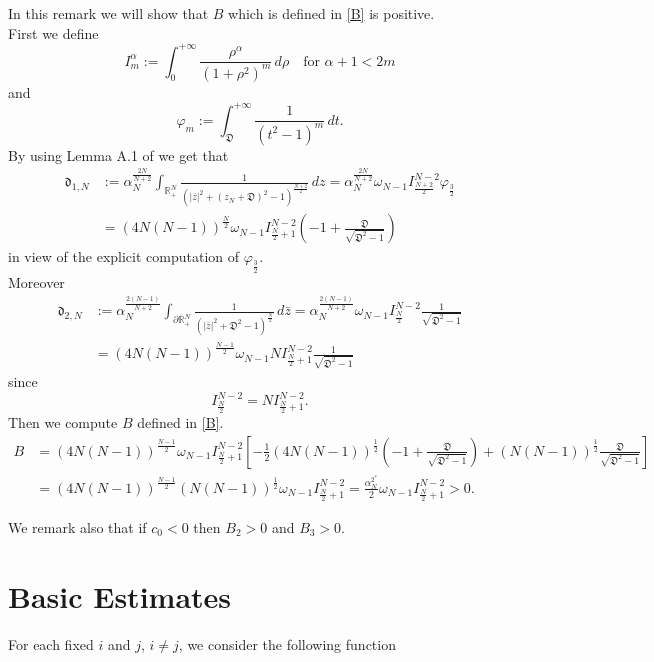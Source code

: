 \documentclass[11pt,a4paper]{amsart}
\begin{document}
\begin{remark}\label{oss}
In this remark we will show that $B$ which is defined in \eqref{B} is positive.\\
First we define $$I_m^\alpha:=\int_0^{+\infty}\frac{\rho^\alpha}{(1+\rho^2)^m}\, d\rho\quad\mbox{for}\,\, \alpha+1<2m$$ and $$\varphi_m:=\int_{\mathfrak D}^{+\infty}\frac{1}{(t^2-1)^m}\, dt.$$
By using Lemma A.1 of \cite{Cruz-BlazquezPistoiaVaira_2022} we get that
$$\begin{aligned}\mathfrak d_{1, N}&:=\alpha_N^{\frac{2N}{N+2}}\int_{\mathbb R^N_+}\frac{1}{\left(|\bar z|^2+(z_N+\mathfrak D)^2-1\right)^{\frac{N+2}{2}}}\, dz=\alpha_N^{\frac{2N}{N+2}}\omega_{N-1}I_{\frac{N+2}{2}}^{N-2}\varphi_{\frac 32}\\
&=\left(4N(N-1)\right)^{\frac N 2}\omega_{N-1}I_{\frac N 2+1}^{N-2}\left(-1+\frac{\mathfrak D}{\sqrt{\mathfrak D^2-1}}\right)\end{aligned}$$
in view of the explicit computation of $\varphi_{\frac 32}$.\\ Moreover
$$\begin{aligned}\mathfrak d_{2, N}&:=\alpha_N^{\frac{2(N-1)}{N+2}}\int_{\partial\mathbb R^N_+}\frac{1}{\left(|\bar z|^2+\mathfrak D^2-1\right)^{\frac{N}{2}}}\, d\bar z=\alpha_N^{\frac{2(N-1)}{N+2}}\omega_{N-1}I_{\frac{N}{2}}^{N-2}\frac{1}{\sqrt{\mathfrak D^2-1}}\\
&=\left(4N(N-1)\right)^{\frac{ N-1}{ 2}}\omega_{N-1}N I_{\frac N 2+1}^{N-2}\frac{1}{\sqrt{\mathfrak D^2-1}}\end{aligned}$$
since $$I_{\frac N2}^{N-2}=N I_{\frac N 2+1}^{N-2}.$$ Then we compute $B$ defined in \eqref{B}.
$$\begin{aligned} B&=\left(4N(N-1)\right)^{\frac{ N-1}{ 2}}\omega_{N-1} I_{\frac N 2+1}^{N-2}\left[-\frac12\left(4N(N-1)\right)^{\frac{ 1}{ 2}}\left( -1+\frac{\mathfrak D}{\sqrt{\mathfrak D^2-1}}\right)+(N(N-1))^{\frac 12}\frac{\mathfrak D}{\sqrt{\mathfrak D^2-1}}\right]\\
&=\left(4N(N-1)\right)^{\frac{ N-1}{ 2}}(N(N-1))^{\frac 12}\omega_{N-1} I_{\frac N 2+1}^{N-2}=\frac{\alpha_N^{2^*}}{2}\omega_{N-1} I_{\frac N 2+1}^{N-2}>0.\end{aligned}$$
\end{remark}
\begin{remark}\label{ossprimo}
We remark also that if $c_0<0$ then $B_2>0$ and $B_3>0$. 
\end{remark}
\section{Basic Estimates}\label{appendice}
For each fixed $i$ and $j$, $i \neq j$, we consider the following function
\end{document}
